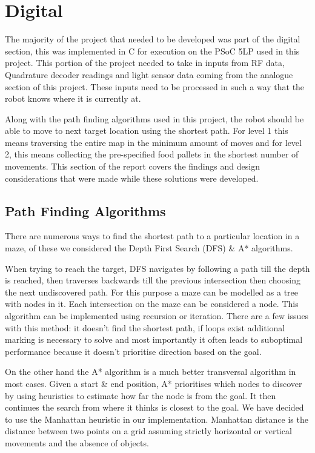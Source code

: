 \documentclass{article}
\begin{document}

\section{Digital}

The majority of the project that needed to be developed was part of the digital section, this was implemented in C for execution on the PSoC 5LP used in this project. This portion of the project needed to take in inputs from RF data, Quadrature decoder readings and light sensor data coming from the analogue section of this project. These inputs need to be processed in such a way that the robot knows where it is currently at. 

Along with the path finding algorithms used in this project, the robot should be able to move to next target location using the shortest path. For level 1 this means traversing the entire map in the minimum amount of moves and for level 2, this means collecting the pre-specified food pallets in the shortest number of movements. This section of the report covers the findings and design considerations that were made while these solutions were developed.

\subsection{Path Finding Algorithms}

There are numerous ways to find the shortest path to a particular location in a maze, of these we considered the Depth First Search (DFS) \& A* algorithms.

When trying to reach the target, DFS navigates by following a path till the depth is reached, then traverses backwards till the previous intersection then choosing the next undiscovered path. For this purpose a maze can be modelled as a tree with nodes in it. Each intersection on the maze can be considered a node. This algorithm can be implemented using recursion or iteration. There are a few issues with this method: it doesn't find the shortest path, if loops exist additional marking is necessary to solve and most importantly it often leads to suboptimal performance because it doesn't prioritise direction based on the goal.

On the other hand the A* algorithm is a much better transversal algorithm in most cases. Given a start \& end position, A* prioritises which nodes to discover by using heuristics to estimate how far the node is from the goal. It then continues the search from where it thinks is closest to the goal. We have decided to use the Manhattan heuristic in our implementation. Manhattan distance is the distance between two points on a grid assuming strictly horizontal or vertical movements and the absence of objects.
\end{document}
